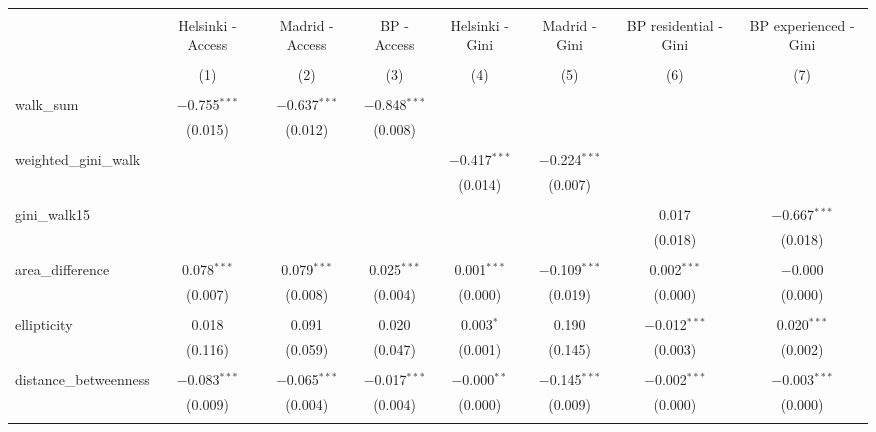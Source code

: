 
\begin{table}[!htbp] \centering 
  \caption{} 
  \label{} 
\begin{tabular}{@{\extracolsep{5pt}}lccccccc} 
\\[-1.8ex]\hline 
\hline \\[-1.8ex] 
 & Helsinki - Access & Madrid - Access & BP - Access & Helsinki - Gini & Madrid - Gini & BP residential - Gini & BP experienced - Gini \\ 
\\[-1.8ex] & (1) & (2) & (3) & (4) & (5) & (6) & (7)\\ 
\hline \\[-1.8ex] 
 walk\_sum & $-$0.755$^{***}$ & $-$0.637$^{***}$ & $-$0.848$^{***}$ &  &  &  &  \\ 
  & (0.015) & (0.012) & (0.008) &  &  &  &  \\ 
  & & & & & & & \\ 
 weighted\_gini\_walk &  &  &  & $-$0.417$^{***}$ & $-$0.224$^{***}$ &  &  \\ 
  &  &  &  & (0.014) & (0.007) &  &  \\ 
  & & & & & & & \\ 
 gini\_walk15 &  &  &  &  &  & 0.017 & $-$0.667$^{***}$ \\ 
  &  &  &  &  &  & (0.018) & (0.018) \\ 
  & & & & & & & \\ 
 area\_difference & 0.078$^{***}$ & 0.079$^{***}$ & 0.025$^{***}$ & 0.001$^{***}$ & $-$0.109$^{***}$ & 0.002$^{***}$ & $-$0.000 \\ 
  & (0.007) & (0.008) & (0.004) & (0.000) & (0.019) & (0.000) & (0.000) \\ 
  & & & & & & & \\ 
 ellipticity & 0.018 & 0.091 & 0.020 & 0.003$^{*}$ & 0.190 & $-$0.012$^{***}$ & 0.020$^{***}$ \\ 
  & (0.116) & (0.059) & (0.047) & (0.001) & (0.145) & (0.003) & (0.002) \\ 
  & & & & & & & \\ 
 distance\_betweenness & $-$0.083$^{***}$ & $-$0.065$^{***}$ & $-$0.017$^{***}$ & $-$0.000$^{**}$ & $-$0.145$^{***}$ & $-$0.002$^{***}$ & $-$0.003$^{***}$ \\ 
  & (0.009) & (0.004) & (0.004) & (0.000) & (0.009) & (0.000) & (0.000) \\ 
  & & & & & & & \\ 

\end{tabular}
\end{table}
